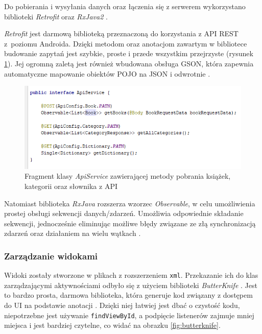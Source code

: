 \documentclass[twoside]{projektInzynierskiMS}
\begin{document}
Do pobierania i wysyłania danych oraz łączenia się z serwerem wykorzystano biblioteki \textit{Retrofit} \cite{retrofit} oraz \textit{RxJava2} \cite{rxjava2}.

\textit{Retrofit} jest darmową biblioteką przeznaczoną do korzystania z API REST z~poziomu Androida. Dzięki metodom oraz anotacjom zawartym w bibliotece budowanie zapytań jest szybkie, proste i przede wszystkim przejrzyste (rysunek \ref{fig:retrofit}). Jej ogromną zaletą jest również wbudowana obsługa GSON, która zapewnia automatyczne mapowanie obiektów POJO na JSON i odwrotnie \cite{PPPAndroida}.

\begin{figure}[h]
  \centering
  \includegraphics[width=0.8\linewidth]{img/android/apiService.png}
  \caption{Fragment klasy \textit{ApiService} zawierającej metody pobrania książek, kategorii oraz słownika z API}
  \label{fig:retrofit}
\end{figure}

Natomiast biblioteka \textit{RxJava} rozszerza wzorzec \textit{Observable}, w celu umożliwienia prostej obsługi sekwencji danych/zdarzeń. Umożliwia odpowiednie składanie sekwencji, jednocześnie eliminując możliwe błędy związane ze złą synchronizacją zdarzeń oraz działaniem na wielu wątkach \cite{rxjava2}.

\subsubsection{Zarządzanie widokami}

Widoki zostały stworzone w plikach z rozszerzeniem \verb`xml`. Przekazanie ich do klas zarządzającymi aktywnościami odbyło się z użyciem biblioteki \textit{ButterKnife} \cite{butterknife}. Jest to bardzo prosta, darmowa biblioteka, która generuje kod związany z dostępem do UI na podstawie anotacji \cite{PPPAndroida}. Dzięki niej łatwiej jest dbać o czystość kodu, niepotrzebne jest używanie \verb`findViewById`, a podpięcie listenerów zajmuje mniej miejsca i jest bardziej czytelne, co widać na obrazku \ref{fig:butterknife}.
\end{document}

